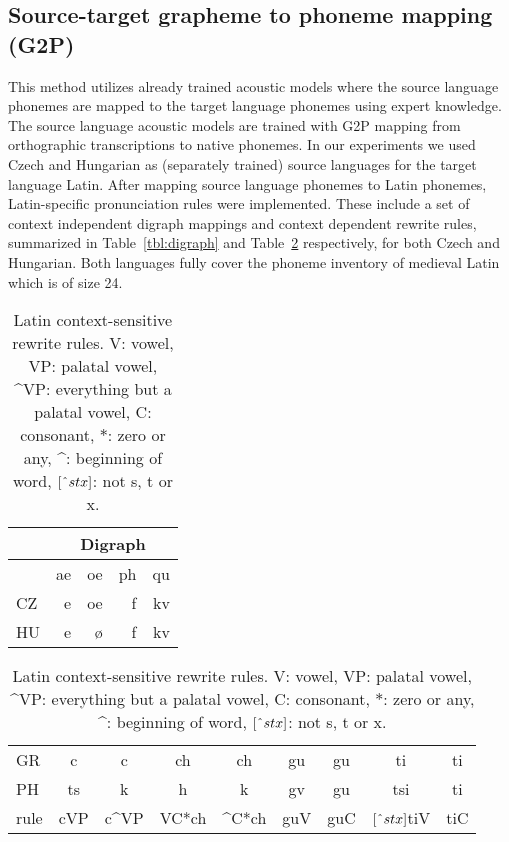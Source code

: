 \documentclass[runningheads,a4paper]{llncs}
\begin{document}
\subsection{Source-target grapheme to phoneme mapping (G2P)}\label{g2p}
This method utilizes already trained acoustic models where the source language phonemes are mapped to the target language phonemes using expert knowledge.
The source language acoustic models are trained with G2P mapping from orthographic transcriptions to native phonemes.
In our experiments we used Czech and Hungarian as (separately trained) source languages for the target language Latin.
After mapping source language phonemes to Latin phonemes, Latin-specific pronunciation rules were implemented.
These include a set of context independent digraph mappings and context dependent rewrite rules, summarized in Table~\ref{tbl:digraph} and Table~\ref{tbl:context} respectively, for both Czech and Hungarian.
Both languages fully cover the phoneme inventory of medieval Latin which is of size 24.

\begin{table}
	\centering
	\caption{Latin digraph context-insensitive rewrite rules.}\label{tbl:digraph}
	\begin{tabular}{l|rrrr}
	\hline
	& \multicolumn{4}{c}{Digraph} \\
	\hline
	   & ae & oe & ph & qu \\
	\hline
	CZ & e & oe & f & kv \\
	HU & e & \o & f & kv \\
	\hline
	\end{tabular}
\vspace*{0.4 cm}
	\centering
	\caption{Latin context-sensitive rewrite rules. V: vowel, VP: palatal vowel, \string^VP: everything but a palatal vowel, C: consonant, $*$: zero or any, \string^: beginning of word, $[\string^stx]$: not s, t or x.}\label{tbl:context}
	\begin{tabular}{l|cc|cc|cc|cc}
	\hline
	GR & c & c & ch & ch & gu & gu & ti & ti \\
	PH & ts & k & h & k & gv & gu & tsi & ti \\
	\hline
	rule & \multicolumn{1}{c|}{cVP} & \multicolumn{1}{c|}{c\string^VP} & \multicolumn{1}{c|}{VC*ch} & \multicolumn{1}{c|}{\string^C*ch} & \multicolumn{1}{c|}{guV} & \multicolumn{1}{c|}{guC} & \multicolumn{1}{c|}{$[\string^stx]$tiV} & \multicolumn{1}{c|}{tiC} \\
	\hline
	\end{tabular}
\end{table}
\end{document}
